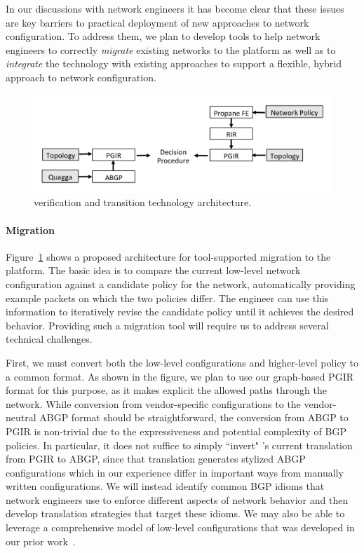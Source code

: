 In our discussions with network engineers it has become clear that these issues are key barriers to practical deployment of new approaches to network configuration.  To address them, we plan to develop tools to help network engineers to correctly {\em migrate} existing networks to the \Name platform as well as to {\em integrate} the \Name technology with existing approaches to support a flexible, hybrid approach to network configuration.


\begin{figure}
  \centering
  \includegraphics[width=.9\textwidth]{figures/transition-tech-arch}
\caption{\Name verification and transition technology architecture.}
\label{fig:transition-tech}
\end{figure}

\paragraph{Migration}  Figure~\ref{fig:transition-tech} shows a proposed architecture for tool-supported migration to the \Name platform.  The basic idea is to compare the current low-level network configuration against a candidate \Name policy for the network, automatically providing example packets on which the two policies differ.  The engineer can use this information to iteratively revise the candidate \Name policy until it achieves the desired behavior.  Providing such a migration tool will require us to address several technical challenges.  

First, we must convert both the low-level configurations and higher-level policy to a common format.  As shown in the figure, we plan to use our graph-based PGIR format for this purpose, as it makes explicit the allowed paths through the network.  While conversion from vendor-specific configurations to the vendor-neutral ABGP format should be straightforward, the conversion from ABGP to PGIR is non-trivial due to the expressiveness and potential complexity of BGP policies.  In particular, it does not suffice to simply ``invert" \Name's current translation from PGIR to ABGP, since that translation generates stylized ABGP configurations which in our experience differ in important ways from manually written configurations.  We will instead identify common BGP idioms that network engineers use to enforce different aspects of network behavior and then develop translation strategies that target these idioms.  We may also be able to leverage a comprehensive model of low-level configurations that was developed in our prior work~\cite{}.

